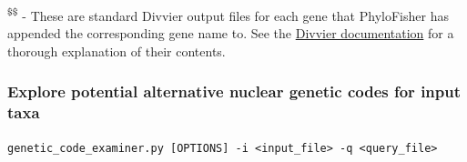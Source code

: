 \documentclass{article}
\def\code#1{\texttt{#1}}
\begin{document}
\begin{description}
        \textsuperscript{\$\$} - These are standard Divvier output files for each gene that PhyloFisher has appended the corresponding gene name to. See the \href{http://amoeba.msstate.edu/phylofisher/pdfs/divvier.pdf}{Divvier documentation} for a thorough explanation of their contents.
        \vspace{0.2cm}
        \end{description}
                
        \vspace{0.5cm}
        
        \subsubsection{Explore potential alternative nuclear genetic codes for input taxa}
        \begin{description}
        
            \vspace{0.2cm}
            \item \code{genetic\_code\_examiner.py [OPTIONS] -i <input\_file> -q <query\_file>}
            \vspace{0.2cm}
            

\end{description}
\end{document}
